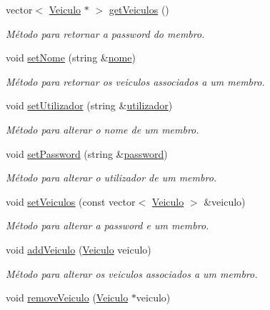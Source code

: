 \begin{DoxyCompactItemize}
vector$<$ \hyperlink{class_veiculo}{Veiculo} $\ast$ $>$ \hyperlink{class_membro_afdd3c41bfc8e859bb8762516440c8144}{get\+Veiculos} ()
\begin{DoxyCompactList}\small\item\em Método para retornar a password do membro. \end{DoxyCompactList}\item 
void \hyperlink{class_membro_a87f95f3869ef8ce4cfaf673cff30cdcc}{set\+Nome} (string \&\hyperlink{class_membro_a2598bbe34ae32a98f41468b2202a9555}{nome})
\begin{DoxyCompactList}\small\item\em Método para retornar os veiculos associados a um membro. \end{DoxyCompactList}\item 
void \hyperlink{class_membro_ac0ce078ab4d7d5a72e370ea6335e8eef}{set\+Utilizador} (string \&\hyperlink{class_membro_a42cc733ff94ec8d1bbfdacc62dfbb0e7}{utilizador})
\begin{DoxyCompactList}\small\item\em Método para alterar o nome de um membro. \end{DoxyCompactList}\item 
void \hyperlink{class_membro_ab5a7b1734090d146bb39f8cfa52be006}{set\+Password} (string \&\hyperlink{class_membro_ae2b12fc3e91efc674c07e735edf4ac21}{password})
\begin{DoxyCompactList}\small\item\em Método para alterar o utilizador de um membro. \end{DoxyCompactList}\item 
void \hyperlink{class_membro_ab40d72d229c4147372bd747d66176f55}{set\+Veiculos} (const vector$<$ \hyperlink{class_veiculo}{Veiculo} $>$ \&veiculo)
\begin{DoxyCompactList}\small\item\em Método para alterar a password e um membro. \end{DoxyCompactList}\item 
void \hyperlink{class_membro_a5b553a2050694926ea081585dc041c8a}{add\+Veiculo} (\hyperlink{class_veiculo}{Veiculo} veiculo)
\begin{DoxyCompactList}\small\item\em Método para alterar os veiculos associados a um membro. \end{DoxyCompactList}\item 
void \hyperlink{class_membro_a9d1b070ef532a6357ecbd0bb52a2be0a}{remove\+Veiculo} (\hyperlink{class_veiculo}{Veiculo} $\ast$veiculo)

\end{DoxyCompactItemize}

